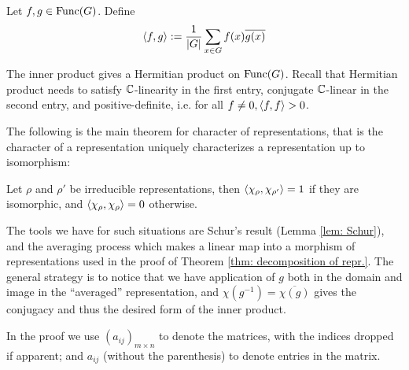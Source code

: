 \documentclass{article}
\begin{document}
\begin{definition}
    Let $f, g \in \mathrm{Func}(G)$. Define 
    \[
        \left\langle f, g \right\rangle := \frac{1}{\left|G\right|} \sum_{x \in G} f(x) \overline{g(x)}
    \]
\end{definition}

\begin{remark}
    The inner product gives a Hermitian product on $\mathrm{Func}(G)$. Recall that Hermitian product needs to satisfy $\mathbb{C}$-linearity in the first entry, conjugate $\mathbb{C}$-linear in the second entry, and positive-definite, i.e. for all $f \neq 0, \left\langle f, f \right\rangle > 0$.
\end{remark}

\textstart
The following is the main theorem for character of representations, that is the character of a representation uniquely characterizes a representation up to isomorphism:

\begin{theorem}\label{thm: inner product of irred repr.}
    Let $\rho$ and $\rho'$ be irreducible representations, then $\left\langle \chi_{\rho}, \chi_{\rho'} \right\rangle = 1$ if they are isomorphic, and $\left\langle \chi_{\rho}, \chi_{\rho} \right\rangle = 0$ otherwise.
\end{theorem}

\textstart
The tools we have for such situations are Schur's result (Lemma \ref{lem: Schur}), and the averaging process which makes a linear map into a morphism of representations used in the proof of Theorem \ref{thm: decomposition of repr.}. The general strategy is to notice that we have application of $g$ both in the domain and image in the ``averaged'' representation, and $\chi(g^{-1}) = \overline{\chi(g)}$ gives the conjugacy and thus the desired form of the inner product.

\begin{notation}
    In the proof we use $(a_{ij})_{m \times n}$ to denote the matrices, with the indices dropped if apparent; and $a_{ij}$ (without the parenthesis) to denote entries in the matrix. 
\end{notation}
\end{document}

